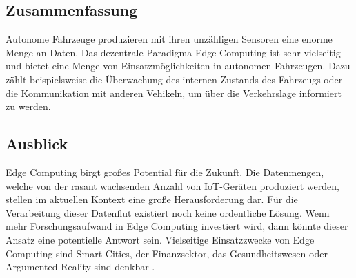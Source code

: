 \documentclass{sigchi}
\begin{document}
\subsection{Zusammenfassung}
Autonome Fahrzeuge produzieren mit ihren unzähligen Sensoren eine enorme Menge an Daten. Das dezentrale Paradigma Edge Computing ist sehr vielseitig und bietet eine Menge von Einsatzmöglichkeiten in autonomen Fahrzeugen. Dazu zählt beispielsweise die Überwachung des internen Zustands des Fahrzeugs oder die Kommunikation mit anderen Vehikeln, um über die Verkehrslage informiert zu werden.

\subsection{Ausblick}
Edge Computing birgt großes Potential für die Zukunft. Die Datenmengen, welche von der rasant wachsenden Anzahl von IoT-Geräten produziert werden, stellen im aktuellen Kontext eine große Herausforderung dar. Für die Verarbeitung dieser Datenflut existiert noch keine ordentliche Lösung. Wenn mehr Forschungsaufwand in Edge Computing investiert wird, dann könnte dieser Ansatz eine potentielle Antwort sein. Vielseitige Einsatzzwecke von Edge Computing sind Smart Cities, der Finanzsektor, das Gesundheitswesen oder Argumented Reality sind denkbar \cite{5-use-cases-1:2019}.


\balance{}



\end{document}
